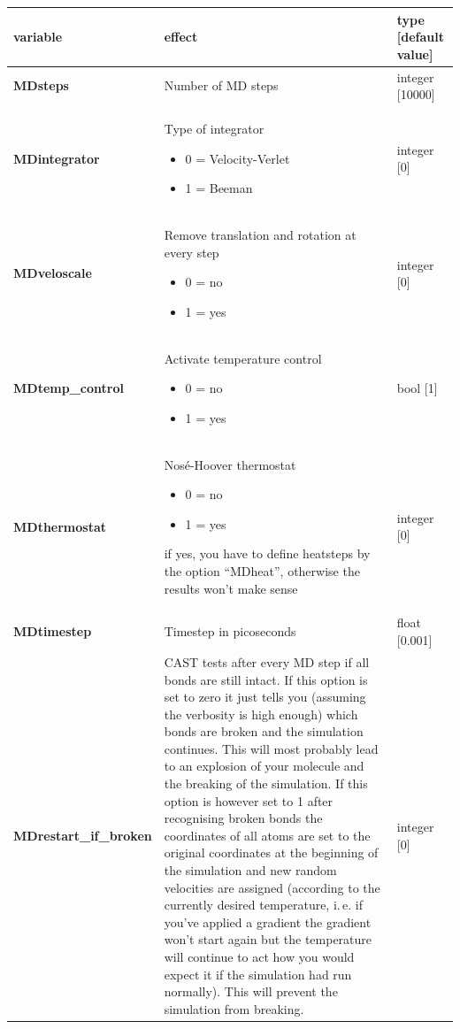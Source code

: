 \documentclass[10pt,a4paper]{article} %
\begin{document}
	\begin{longtable}{|p{4cm}|p{4.5cm}|p{3cm}|}
		variable & effect & type [default value] \\
		\hline
		\textbf{MDsteps} & Number of MD steps & integer [10000] \\
		\textbf{MDintegrator} & Type of integrator \begin{itemize}
			\item 0  = Velocity-Verlet \item 1 = Beeman
			\end{itemize} 	
		& integer [0] \\
		\textbf{MDveloscale} & Remove translation and rotation at every step\begin{itemize} \item 0 = no \item 1 = yes\end{itemize}& integer [0] \\
		\textbf{MDtemp\_control} & Activate temperature control\begin{itemize} \item 0 = no \item 1 = yes\end{itemize}& bool [1] \\
		\textbf{MDthermostat} & Nosé-Hoover thermostat\begin{itemize} \item 0 = no \item 1 = yes\end{itemize} if yes, you have to define heatsteps by the option ``MDheat'', otherwise the results won't make sense
		 & integer [0] \\
		\textbf{MDtimestep} & Timestep in picoseconds & float [0.001] \\
		\textbf{MDrestart\_if\_broken} & CAST tests after every MD step if all bonds are still intact. If this option is set to zero it just tells you (assuming the verbosity is high enough) which bonds are broken and the simulation continues. This will most probably lead to an explosion of your molecule and the breaking of the simulation. If this option is however set to 1 after recognising broken bonds the coordinates of all atoms are set to the original coordinates at the beginning of the simulation and new random velocities are assigned (according to the currently desired temperature, i.\,e. if you've applied a gradient the gradient won't start again but the temperature will continue to act how you would expect it if the simulation had run normally). This will prevent the simulation from breaking. & integer [0] \\

\end{longtable}
\end{document}
